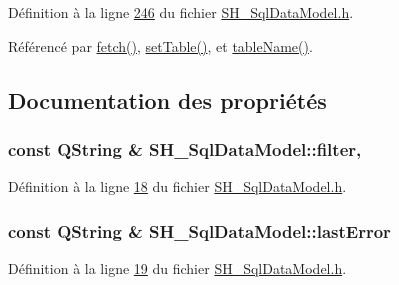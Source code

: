 Définition à la ligne \hyperlink{SH__SqlDataModel_8h_source_l00246}{246} du fichier \hyperlink{SH__SqlDataModel_8h_source}{S\-H\-\_\-\-Sql\-Data\-Model.\-h}.



Référencé par \hyperlink{classSH__SqlDataModel_a8d9b08d282a304945b9ee2f474020980}{fetch()}, \hyperlink{classSH__SqlDataModel_a25a89526277d5ae8ebe2466dd178da8f}{set\-Table()}, et \hyperlink{classSH__SqlDataModel_a2497b87a0e4864f3d3e2f10f16ca19f1}{table\-Name()}.



\subsection{Documentation des propriétés}
\hypertarget{classSH__SqlDataModel_a52d2212d201cd31ad0ebfebc1664c3ad}{
\subsubsection[{filter}]{\setlength{\rightskip}{0pt plus 5cm}const Q\-String \& S\-H\-\_\-\-Sql\-Data\-Model\-::filter\hspace{0.3cm}{\ttfamily [read]}, {\ttfamily [write]}}}\label{classSH__SqlDataModel_a52d2212d201cd31ad0ebfebc1664c3ad}


Définition à la ligne \hyperlink{SH__SqlDataModel_8h_source_l00018}{18} du fichier \hyperlink{SH__SqlDataModel_8h_source}{S\-H\-\_\-\-Sql\-Data\-Model.\-h}.

\hypertarget{classSH__SqlDataModel_a43b4b2cca5c2d19fd63b2e528d6c0686}{
\subsubsection[{last\-Error}]{\setlength{\rightskip}{0pt plus 5cm}const Q\-String \& S\-H\-\_\-\-Sql\-Data\-Model\-::last\-Error\hspace{0.3cm}{\ttfamily [read]}}}\label{classSH__SqlDataModel_a43b4b2cca5c2d19fd63b2e528d6c0686}


Définition à la ligne \hyperlink{SH__SqlDataModel_8h_source_l00019}{19} du fichier \hyperlink{SH__SqlDataModel_8h_source}{S\-H\-\_\-\-Sql\-Data\-Model.\-h}.



